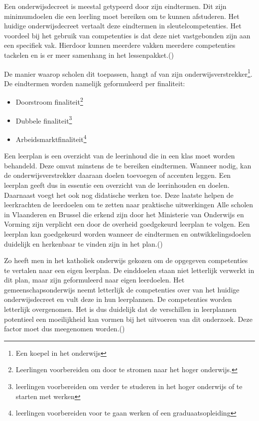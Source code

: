 Een onderwijsdecreet is meestal getypeerd door zijn eindtermen. Dit zijn minimumdoelen die een leerling moet bereiken om te kunnen afstuderen. Het huidige onderwijsdecreet vertaalt deze eindtermen in sleutelcompetenties. Het voordeel bij het gebruik van competenties is dat deze niet vastgebonden zijn aan een specifiek vak. Hierdoor kunnen meerdere vakken meerdere competenties tackelen en is er meer samenhang in het lessenpakket.(\cite{Vlaanderen2018})

De manier waarop scholen dit toepassen, hangt af van zijn onderwijsverstrekker\footnote{Een koepel in het onderwijs}. De eindtermen worden namelijk geformuleerd per finaliteit:
\begin{itemize}
    \item Doorstroom finaliteit\footnote{Leerlingen voorbereiden om door te stromen naar het hoger onderwijs.}
    \item Dubbele finaliteit\footnote{leerlingen voorbereiden om verder te studeren in het hoger onderwijs of te starten met werken}
    \item Arbeidsmarktfinaliteit\footnote{leerlingen voorbereiden voor te gaan werken of een graduaatsopleiding}
\end{itemize}
Een leerplan is een overzicht van de leerinhoud die in een klas moet worden behandeld. Deze omvat minstens de te bereiken eindtermen. Wanneer nodig, kan de onderwijsverstrekker daaraan doelen toevoegen of accenten leggen. Een leerplan geeft dus in essentie een overzicht van de leerinhouden en doelen. Daarnaast voegt het ook nog didatische werken toe. Deze laatste helpen de leerkrachten de leerdoelen om te zetten naar praktische uitwerkingen Alle scholen in Vlaanderen en Brussel die erkend zijn door het Ministerie van Onderwijs en Vorming zijn verplicht een door de overheid goedgekeurd leerplan te volgen.  Een leerplan kan goedgekeurd worden wanneer de eindtermen en ontwikkelingsdoelen duidelijk en herkenbaar te vinden zijn in het plan.(\cite{Parlement})

Zo heeft men in het katholiek onderwijs gekozen om de opgegeven competenties te vertalen naar een eigen leerplan. De einddoelen staan niet letterlijk verwerkt in dit plan, maar zijn geformuleerd naar eigen leerdoelen. Het gemeenschapsonderwijs neemt letterlijk de competenties over van het huidige onderwijsdecreet en vult deze in hun leerplannen. De competenties worden letterlijk overgenomen. Het is dus duidelijk dat de verschillen in leerplannen potentieel een moeilijkheid kan vormen bij het uitvoeren van dit onderzoek. Deze factor moet dus meegenomen worden.(\cite{Llinkid2019,Smartschool})

